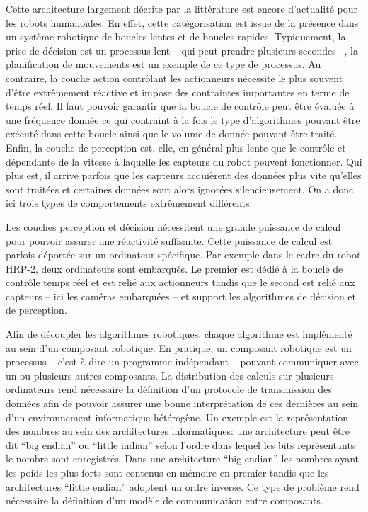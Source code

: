 Cette architecture largement décrite par la littérature est encore
d'actualité pour les robots humanoïdes. En effet, cette catégorisation
est issue de la présence dans un système robotique de boucles lentes
et de boucles rapides. Typiquement, la prise de décision est un
processus lent -- qui peut prendre plusieurs secondes --, la
planification de mouvements est un exemple de ce type de processus. Au
contraire, la couche action contrôlant les actionneurs nécessite le
plus souvent d'être extrêmement réactive et impose des contraintes
importantes en terme de temps réel. Il faut pouvoir garantir que la
boucle de contrôle peut être évaluée à une fréquence donnée ce qui
contraint à la fois le type d'algorithmes pouvant être exécuté dans
cette boucle ainsi que le volume de donnée pouvant être traité. Enfin,
la couche de perception est, elle, en général plus lente que le
contrôle et dépendante de la vitesse à laquelle les capteurs du robot
peuvent fonctionner. Qui plus est, il arrive parfois que les capteurs
acquièrent des données plus vite qu'elles sont traitées et certaines
données sont alors ignorées silencieusement. On a donc ici trois types
de comportements extrêmement différents.


Les couches perception et décision nécessitent une grande puissance de
calcul pour pouvoir assurer une réactivité suffisante. Cette puissance
de calcul est parfois déportée sur un ordinateur spécifique. Par
exemple dans le cadre du robot HRP-2, deux ordinateurs sont
embarqués. Le premier est dédié à la boucle de contrôle temps réel et
est relié aux actionneurs tandis que le second est relié aux capteurs
-- ici les caméras embarquées -- et support les algorithmes de
décision et de perception.


Afin de découpler les algorithmes robotiques, chaque algorithme est
implémenté au sein d'un composant robotique. En pratique, un
composant robotique est un processus -- c'est-à-dire un programme
indépendant -- pouvant communiquer avec un ou plusieurs autres
composants. La distribution des calculs sur plusieurs ordinateurs rend
nécessaire la définition d'un protocole de transmission des données
afin de pouvoir assurer une bonne interprétation de ces dernières au
sein d'un environnement informatique hétérogène. Un exemple est la
représentation des nombres au sein des architectures informatiques:
une architecture peut être dit ``big endian'' ou ``little indian'' selon l'ordre dans lequel les bits représentants le
nombre sont enregistrés. Dans une architecture ``big endian'' les
nombres ayant les poids les plus forts sont contenus en mémoire en
premier tandis que les architectures ``little endian'' adoptent un
ordre inverse. Ce type de problème rend nécessaire la définition d'un
modèle de communication entre composants.


